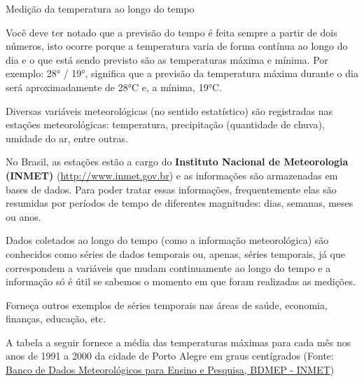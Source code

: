 {{\label{est1-ativ-10}
\begin{task}{Medição da temperatura ao longo do tempo}

Você deve ter notado que a previsão do tempo é feita sempre a partir de dois números, isto ocorre porque a temperatura varia de forma contínua ao longo do dia e o que está sendo previsto são as temperaturas máxima e mínima. Por exemplo: 28° / 19°, significa que a previsão da temperatura máxima durante o dia será aproximadamente de 28°C e, a mínima, 19°C.

Diversas variáveis meteorológicas (no sentido estatístico) são registradas nas estações meteorológicas: temperatura, precipitação (quantidade de chuva), umidade do ar, entre outras.

No Brasil, as estações estão a cargo do \textbf {Instituto Nacional de Meteorologia (INMET)} (\href{http://www.inmet.gov.br}{http://www.inmet.gov.br}) e as informações são armazenadas em bases de dados. Para poder tratar essas informações, frequentemente elas são resumidas por períodos de tempo de diferentes magnitudes: dias, semanas, meses ou anos.

Dados coletados ao longo do tempo (como a informação meteorológica) são conhecidos como séries de dados temporais ou, apenas, séries temporais, já que correspondem a variáveis que mudam continuamente ao longo do tempo e a informação só é útil se sabemos o momento em que foram realizadas as medições.

\begin{reflection}

Forneça outros exemplos de séries temporais nas áreas de saúde, economia, finanças, educação, etc.
\end{reflection}

\justify
A tabela a seguir fornece a média das temperaturas máximas para cada mês nos anos de 1991 a 2000 da cidade de Porto Alegre em graus centígrados (Fonte: \href{http://www.inmet.gov.br/portal/index.php?r=bdmep/bdmep}{Banco de Dados Meteorológicos para Ensino e Pesquisa, BDMEP - INMET})



\end{task}}}
